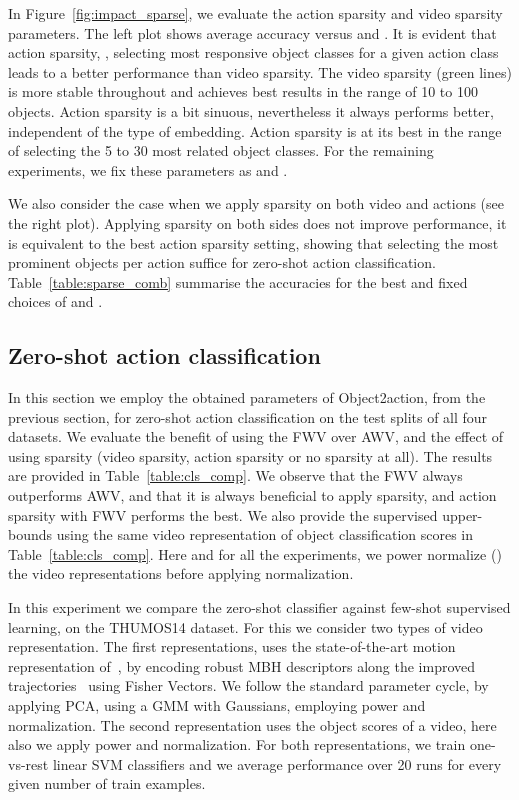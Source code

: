 In Figure~\ref{fig:impact_sparse},  we evaluate the action sparsity and video sparsity parameters.
The left plot shows average accuracy versus  and . 
It is evident that action sparsity, \ie, selecting most responsive object classes for a given action class leads to a better 
performance than video sparsity. 
The video sparsity (green lines) is more stable throughout and achieves best results in the range of 10 to 100 objects. 
Action sparsity is a bit sinuous, nevertheless it always performs better, independent of the type of embedding. 
Action sparsity is at its best in the range of selecting the 5 to 30 most related object classes. 
For the remaining experiments, we fix these parameters as  and .

We also consider the case when we apply sparsity on both video and actions (see the right plot). 
Applying sparsity on both sides does not improve performance, it is equivalent to the best action sparsity setting, showing that selecting the most prominent objects per action suffice for zero-shot action classification.
Table~\ref{table:sparse_comb} summarise the accuracies for the best and fixed choices of  and . 


\subsection{Zero-shot action classification}	 \label{sec:act_cls}
In this section we employ the obtained parameters of Object2action, from the previous section, for zero-shot action classification on the test splits of all four  datasets.
We evaluate the benefit of using the FWV over AWV, and the effect of using sparsity (video sparsity, action sparsity or no sparsity at all).
The results are provided in Table~\ref{table:cls_comp}. 
We observe that the FWV always outperforms AWV, and that it is always beneficial to apply sparsity, and action sparsity with FWV performs the best.
{We also provide the supervised upper-bounds using the same video representation of object classification scores in Table~\ref{table:cls_comp}. Here and for all the experiments, 
we power normalize () the video representations before applying  normalization.}

In this experiment we compare the zero-shot classifier against few-shot supervised learning, on the THUMOS14 dataset.
For this we consider two types of video representation. 
The first representations, uses the state-of-the-art motion representation of~\cite{wang:imptraj13}, by encoding robust MBH descriptors along the improved trajectories~\cite{wang:imptraj13} using Fisher Vectors.
We follow the standard parameter cycle, by applying PCA, using a GMM with  Gaussians, employing power and  normalization.
The second representation uses the object scores  of a video, here also we apply power and  normalization. 
For both representations, we train one-vs-rest linear SVM classifiers and we average performance over 20 runs for every given number of train examples.

